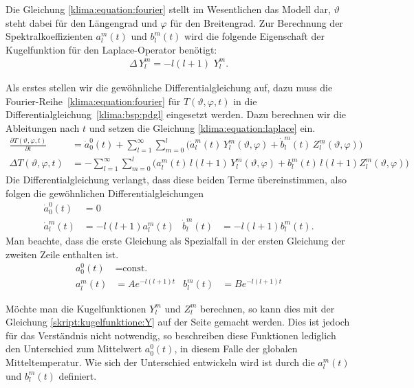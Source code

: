 \begin{refsection}
Die Gleichung \eqref{klima:equation:fourier} stellt im Wesentlichen
das Modell dar, $\vartheta$ steht dabei für den Längengrad und
$\varphi$ für den Breitengrad. Zur Berechnung der
Spektralkoeffizienten
%
$a^m_l(t)$ und
$b^m_l(t)$ wird die folgende Eigenschaft der Kugelfunktion für den
Laplace-Operator benötigt:
\begin{align}
\Delta \,Y^m_l=-l(l+1)\,\,Y^m_l.
\label{klima:equation:laplace}
\end{align}

Als erstes stellen wir die gewöhnliche Differentialgleichung auf,
dazu muss die Fourier-Reihe~\eqref{klima:equation:fourier} für
$T(\vartheta ,\varphi ,t)$ in die
Differentialgleichung~\eqref{klima:bsp:pdgl} eingesetzt werden.
Dazu berechnen wir die Ableitungen nach $t$ und setzen die Gleichung
\eqref{klima:equation:laplace} ein.
\begin{align*}
\frac{\partial T(\vartheta ,\varphi ,t)}{\partial t} &=
\dot{a}^0_0(t)+\sum_{l=1}^\infty\sum_{m=0}^l \bigl( \dot{a}^m_l(t)\,Y^m_l(\vartheta ,\varphi)+\dot{b}^m_l(t)\,Z^m_l(\vartheta ,\varphi)\bigr)
\\
\Delta T(\vartheta ,\varphi ,t) &=
- \sum_{l=1}^\infty\sum_{m=0}^l \bigl( a^m_l(t)\,l(l+1)\,Y^m_l(\vartheta ,\varphi)+b^m_l(t)\,l(l+1)Z^m_l(\vartheta ,\varphi)\bigr)
\end{align*}
Die Differentialgleichung verlangt, dass diese beiden Terme
übereinstimmen, also folgen die gewöhnlichen Differentialgleichungen
\begin{align*}
\dot a^0_0(t)&= 0
\\
\dot a^m_l(t)&=-l(l+1)a^m_l(t)&
\dot b^m_l(t)&=-l(l+1)b^m_l(t).
\end{align*}
Man beachte, dass die erste Gleichung als Spezialfall in der ersten
Gleichung der zweiten Zeile enthalten ist.
\begin{align*}
a^0_0(t)&=\text{const.}
\\
a^m_l(t) &=Ae^{-l(l+1)t}&
b^m_l(t) &=Be^{-l(l+1)t}
\end{align*}

Möchte man die Kugelfunktionen $Y^m_l$ und $Z^m_l$ berechnen, so
kann dies mit der Gleichung \eqref{skript:kugelfunktione:Y} auf der
Seite \pageref{skript:kugelfunktione:Y} gemacht werden. Dies ist
jedoch für das Verständnis nicht notwendig, so beschreiben diese
Funktionen lediglich den Unterschied zum Mittelwert $a^0_0(t)$, in
diesem Falle der globalen Mitteltemperatur. Wie sich der Unterschied
entwickeln wird ist durch die $a^m_l(t)$ und $b^m_l(t)$ definiert.


\end{refsection}
